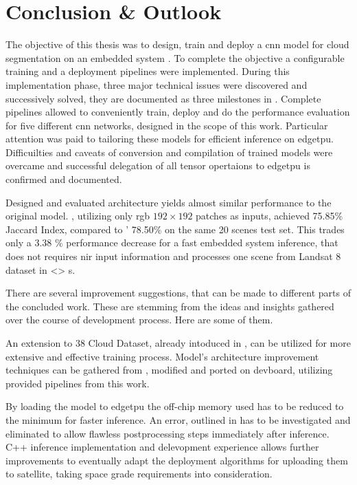 {

\setlength{\parindent}{0pt}
\setlength{\parskip}{1em}

\chapter{Conclusion \& Outlook}

The objective of this thesis was to design, train and deploy a \gls{cnn} model for cloud segmentation on an embedded system .
To complete the objective a configurable training and a deployment pipelines were implemented.
During this implementation phase, three major technical issues were discovered and successively solved,
they are documented as three milestones in .
Complete pipelines allowed to conveniently train, deploy and do the performance evaluation for five different \gls{cnn} networks,
designed in the scope of this work.
Particular attention was paid to tailoring these models for efficient inference on \gls{edgetpu}.
Difficuilties and caveats of conversion and compilation of trained models were overcame
and successful delegation of all tensor opertaions to \gls{edgetpu} is confirmed and documented.

Designed and evaluated  architecture yields almost similar performance to the original  model\cite{CloudNet2019}.
, utilizing only \gls{rgb} \ensuremath{192\times192} patches as inputs, achieved 75.85\% Jaccard Index,
compared to ' 78.50\% on the same 20 scenes test set. This trades only a 3.38 \% performance decrease for a fast embedded system inference,
that does not requires \gls{nir} input information and processes one scene from Landsat 8 dataset in <> s.

There are several improvement suggestions, that can be made to different parts of the concluded work. These are stemming from the
ideas and insights gathered over the course of development process. Here are some of them.

An extension to 38 Cloud Dataset, already intoduced in \cite{CloudNetNew}, can be utilized for more extensive and effective training process.
Model's architecture improvement techniques can be gathered from \cite{CloudNetNew}, modified and ported on \gls{devboard},
utilizing provided pipelines from this work.


By loading the model to \gls{edgetpu} the off-chip memory used has to be reduced to the minimum for faster inference.
An error, outlined in  has to be investigated and eliminated to allow flawless postprocessing steps immediately after inference.
C++ inference implementation and delevopment experience allows further improvements to eventually adapt the deployment algorithms for uploading them to satellite,
taking space grade requirements into consideration.

}
